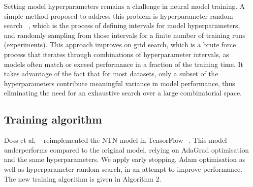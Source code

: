 \noindent Setting model hyperparameters remains a challenge in neural model training. A simple method proposed to address this problem is hyperparameter random search \unskip ~\citep{bergstra2012random}, which is the process of defining intervals for model hyperparameters, and randomly sampling from those intervals for a finite number of training runs (experiments). This approach improves on grid search, which is a brute force process that iterates through combinations of hyperparameter intervals, as models often match or exceed performance in a fraction of the training time. It takes advantage of the fact that for most datasets, only a subset of the hyperparameters contribute meaningful variance in model performance, thus eliminating the need for an exhaustive search over a large combinatorial space. \par

\subsection{Training algorithm}

Doss et al. \unskip~\citep{Doss2015} reimplemented the NTN model in TensorFlow \unskip ~\citep{abadi2016tensorflow}. This model underperforms compared to the original model, relying on AdaGrad optimisation and the same hyperparameters. We apply early stopping, Adam optimisation as well as hyperparameter random search, in an attempt to improve performance. The new training algorithm is given in Algorithm 2. 

